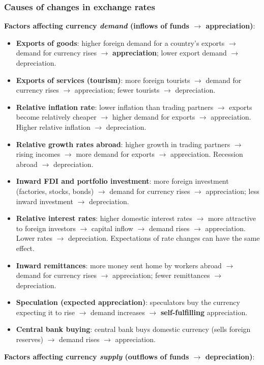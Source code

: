 \documentclass[a4paper,12pt]{article}
\begin{document}
\subsubsection*{Causes of changes in exchange rates}
\textbf{Factors affecting currency \textit{demand} (inflows of funds $\to$ appreciation)}:
\begin{itemize}
  \item \textbf{Exports of goods}: higher foreign demand for a country's exports $\to$ demand for currency rises $\to$ \textbf{appreciation}; lower export demand $\to$ depreciation.
  \item \textbf{Exports of services (tourism)}: more foreign tourists $\to$ demand for currency rises $\to$ appreciation; fewer tourists $\to$ depreciation.
  \item \textbf{Relative inflation rate}: lower inflation than trading partners $\to$ exports become relatively cheaper $\to$ higher demand for exports $\to$ appreciation. Higher relative inflation $\to$ depreciation.
  \item \textbf{Relative growth rates abroad}: higher growth in trading partners $\to$ rising incomes $\to$ more demand for exports $\to$ appreciation. Recession abroad $\to$ depreciation.
  \item \textbf{Inward FDI and portfolio investment}: more foreign investment (factories, stocks, bonds) $\to$ demand for currency rises $\to$ appreciation; less inward investment $\to$ depreciation.
  \item \textbf{Relative interest rates}: higher domestic interest rates $\to$ more attractive to foreign investors $\to$ capital inflow $\to$ demand rises $\to$ appreciation. Lower rates $\to$ depreciation. Expectations of rate changes can have the same effect.
  \item \textbf{Inward remittances}: more money sent home by workers abroad $\to$ demand for currency rises $\to$ appreciation; fewer remittances $\to$ depreciation.
  \item \textbf{Speculation (expected appreciation)}: speculators buy the currency expecting it to rise $\to$ demand increases $\to$ \textbf{self-fulfilling} appreciation.
  \item \textbf{Central bank buying}: central bank buys domestic currency (sells foreign reserves) $\to$ demand rises $\to$ appreciation.
\end{itemize}
\textbf{Factors affecting currency \textit{supply} (outflows of funds $\to$ depreciation)}:
\end{document}

